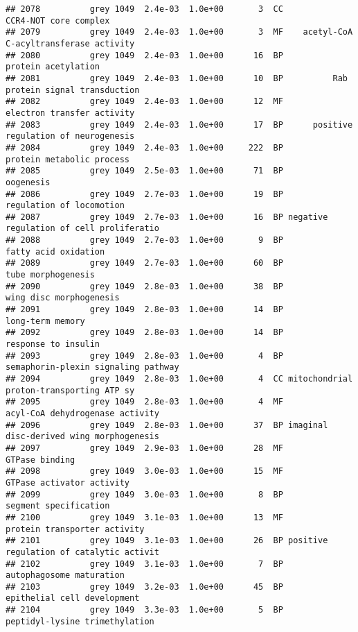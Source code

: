 \documentclass[]{article}
\begin{document}
\begin{verbatim}
## 2078          grey 1049  2.4e-03  1.0e+00       3  CC                    CCR4-NOT core complex
## 2079          grey 1049  2.4e-03  1.0e+00       3  MF    acetyl-CoA C-acyltransferase activity
## 2080          grey 1049  2.4e-03  1.0e+00      16  BP                      protein acetylation
## 2081          grey 1049  2.4e-03  1.0e+00      10  BP          Rab protein signal transduction
## 2082          grey 1049  2.4e-03  1.0e+00      12  MF               electron transfer activity
## 2083          grey 1049  2.4e-03  1.0e+00      17  BP      positive regulation of neurogenesis
## 2084          grey 1049  2.4e-03  1.0e+00     222  BP                protein metabolic process
## 2085          grey 1049  2.5e-03  1.0e+00      71  BP                                oogenesis
## 2086          grey 1049  2.7e-03  1.0e+00      19  BP                 regulation of locomotion
## 2087          grey 1049  2.7e-03  1.0e+00      16  BP negative regulation of cell proliferatio
## 2088          grey 1049  2.7e-03  1.0e+00       9  BP                     fatty acid oxidation
## 2089          grey 1049  2.7e-03  1.0e+00      60  BP                       tube morphogenesis
## 2090          grey 1049  2.8e-03  1.0e+00      38  BP                  wing disc morphogenesis
## 2091          grey 1049  2.8e-03  1.0e+00      14  BP                         long-term memory
## 2092          grey 1049  2.8e-03  1.0e+00      14  BP                      response to insulin
## 2093          grey 1049  2.8e-03  1.0e+00       4  BP      semaphorin-plexin signaling pathway
## 2094          grey 1049  2.8e-03  1.0e+00       4  CC mitochondrial proton-transporting ATP sy
## 2095          grey 1049  2.8e-03  1.0e+00       4  MF          acyl-CoA dehydrogenase activity
## 2096          grey 1049  2.8e-03  1.0e+00      37  BP imaginal disc-derived wing morphogenesis
## 2097          grey 1049  2.9e-03  1.0e+00      28  MF                           GTPase binding
## 2098          grey 1049  3.0e-03  1.0e+00      15  MF                GTPase activator activity
## 2099          grey 1049  3.0e-03  1.0e+00       8  BP                    segment specification
## 2100          grey 1049  3.1e-03  1.0e+00      13  MF             protein transporter activity
## 2101          grey 1049  3.1e-03  1.0e+00      26  BP positive regulation of catalytic activit
## 2102          grey 1049  3.1e-03  1.0e+00       7  BP                 autophagosome maturation
## 2103          grey 1049  3.2e-03  1.0e+00      45  BP              epithelial cell development
## 2104          grey 1049  3.3e-03  1.0e+00       5  BP           peptidyl-lysine trimethylation

\end{verbatim}
\end{document}
